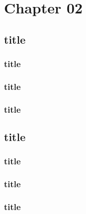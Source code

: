\chapter{Chapter 02}
\lipsum[2]

\section{title}
\lipsum[1-3]
\subsection{title}
\lipsum[1-3]
\subsection{title}
\lipsum[1-3]
\subsection{title}
\lipsum[1-3]
\section{title}
\lipsum[1-3]
\subsection{title}
\lipsum[1-3]
\subsection{title}
\lipsum[1-3]
\subsection{title}
\lipsum[1-3]